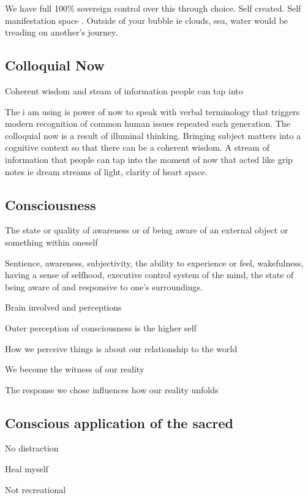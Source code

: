 We have full 100\% sovereign control over this through choice. Self
created. Self manifestation space . Outside of your bubble ie clouds,
sea, water would be treading on another's journey.

\subsection{Colloquial Now}\label{colloquial-now}

Coherent wisdom and steam of information people can tap into

The i am using is power of now to speak with verbal terminology that
triggers modern recognition of common human issues repeated each
generation. The colloquial now is a result of illuminal thinking.
Bringing subject matters into a cognitive context so that there can be a
coherent wisdom. A stream of information that people can tap into the
moment of now that acted like grip notes ie dream streams of light,
clarity of heart space.

\subsection{Consciousness}\label{consciousness}

The state or quality of awareness or of being aware of an external
object or something within oneself

Sentience, awareness, subjectivity, the ability to experience or feel,
wakefulness, having a sense of selfhood, executive control system of the
mind, the state of being aware of and responsive to one's surroundings.

Brain involved and perceptions

Outer perception of consciousness is the higher self

How we perceive things is about our relationship to the world

We become the witness of our reality

The response we chose influences how our reality unfolds

\subsection{Conscious application of the
sacred}\label{conscious-application-of-the-sacred}

No distraction

Heal myself

Not recreational

